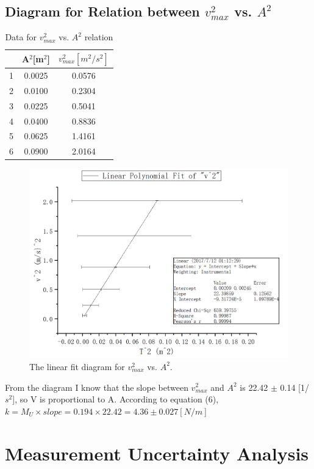\documentclass[12pt]{article}
\begin{document}
\subsection{Diagram for Relation between $v_{max}^2$ vs. $A^2$} 
\begin{table}[H]
\centering
\begin{tabular}{|c|c|c|}
\hline
  & A$^2$[m$^2$] & $v_{max}^2[m^2/s^2]$ \\ \hline
1 & 0.0025    & 0.0576   \\ \hline
2 & 0.0100      & 0.2304   \\ \hline
3 & 0.0225     & 0.5041   \\ \hline
4 & 0.0400      & 0.8836   \\ \hline
5 & 0.0625     & 1.4161   \\ \hline
6 & 0.0900      & 2.0164   \\ \hline
\end{tabular}
\caption{Data for $v_{max}^2$ vs. $A^2$ relation}
\end{table}
\begin{figure}[H]
\centering
\includegraphics[scale=0.4]{P12.jpg}
\caption{The linear fit diagram for  $v_{max}^2$ vs. $A^2$.}
\end{figure}
From the diagram I know that the slope between $v_{max}^2$ and $A^2$ is 22.42 $\pm$ 0.14 [1/$s^2$], so V is proportional to A. According to equation (6), $k=M_U\times{slope}=0.194\times22.42=4.36\pm0.027[N/m]$
\section{Measurement Uncertainty Analysis}
\end{document}
